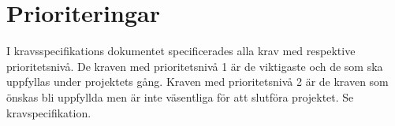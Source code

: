 \documentclass[projektplan/plan.tex]{subfiles}
\begin{document}
\section{Prioriteringar} I kravsspecifikations dokumentet specificerades alla
krav med respektive prioritetsnivå. De kraven med prioritetsnivå 1 är de
viktigaste och de som ska uppfyllas under projektets gång. Kraven med
prioritetsnivå 2 är de kraven som önskas bli uppfyllda men är inte väsentliga
för att slutföra projektet. Se kravspecifikation. 
\end{document}
